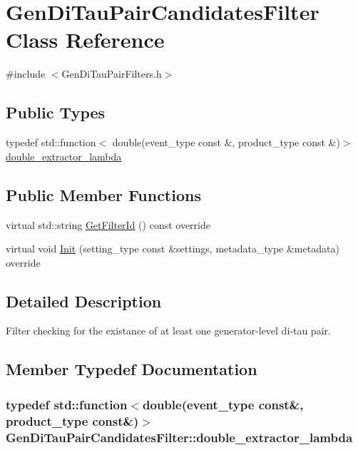 \hypertarget{classGenDiTauPairCandidatesFilter}{
\section{GenDiTauPairCandidatesFilter Class Reference}
\label{classGenDiTauPairCandidatesFilter}
}


{\ttfamily \#include $<$GenDiTauPairFilters.h$>$}\subsection*{Public Types}
\begin{DoxyCompactItemize}
\item 
typedef std::function$<$ double(event\_\-type const \&, product\_\-type const \&)$>$ \hyperlink{classGenDiTauPairCandidatesFilter_afc2604859e5b179f052d81c32ff7010c}{double\_\-extractor\_\-lambda}
\end{DoxyCompactItemize}
\subsection*{Public Member Functions}
\begin{DoxyCompactItemize}
\item 
virtual std::string \hyperlink{classGenDiTauPairCandidatesFilter_afb40086e1d3bdca2f63c109064e0ed03}{GetFilterId} () const override
\item 
virtual void \hyperlink{classGenDiTauPairCandidatesFilter_a3de66c0061604b156053712155f36b45}{Init} (setting\_\-type const \&settings, metadata\_\-type \&metadata) override
\end{DoxyCompactItemize}


\subsection{Detailed Description}
Filter checking for the existance of at least one generator-\/level di-\/tau pair. 

\subsection{Member Typedef Documentation}
\hypertarget{classGenDiTauPairCandidatesFilter_afc2604859e5b179f052d81c32ff7010c}{
\subsubsection[{double\_\-extractor\_\-lambda}]{\setlength{\rightskip}{0pt plus 5cm}typedef std::function$<$double(event\_\-type const\&, product\_\-type const\&)$>$ {\bf GenDiTauPairCandidatesFilter::double\_\-extractor\_\-lambda}}}
\label{classGenDiTauPairCandidatesFilter_afc2604859e5b179f052d81c32ff7010c}


